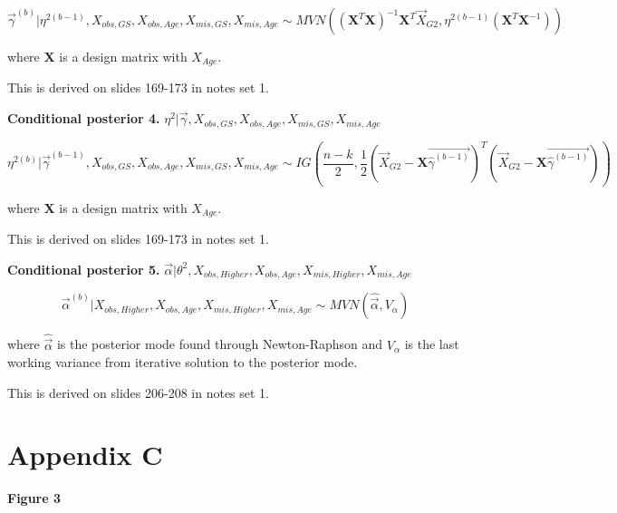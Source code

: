 \documentclass[11pt]{article}
\begin{document}
$$\vec{\gamma}^{(b)}|\eta^{2(b - 1)}, X_{obs, GS}, X_{obs, Age}, X_{mis, GS}, X_{mis, Age} \sim MVN((\mathbf{X}^T\mathbf{X})^{-1}\mathbf{X}^T\vec{X}_{G2}, \eta^{2(b - 1)}(\mathbf{X}^T\mathbf{X}^{-1}))$$

where $\mathbf{X}$ is a design matrix with $X_{Age}$.

This is derived on slides 169-173 in notes set 1.

\vspace{0.25in}

\textbf{Conditional posterior 4.} $\eta^2|\vec{\gamma}, X_{obs, GS}, X_{obs, Age}, X_{mis, GS}, X_{mis, Age}$

$$\eta^{2(b)}|\vec{\gamma}^{(b - 1)}, X_{obs, GS}, X_{obs, Age}, X_{mis, GS}, X_{mis, Age} \sim IG\left(\frac{n - k}{2}, \frac{1}{2}(\vec{X}_{G2} - \mathbf{X}\vec{\hat\gamma^{(b - 1)}})^T(\vec{X}_{G2} - \mathbf{X}\vec{\hat\gamma^{(b - 1)}})\right)$$

where $\mathbf{X}$ is a design matrix with $X_{Age}$.

This is derived on slides 169-173 in notes set 1.

\vspace{0.25in}

\textbf{Conditional posterior 5.} $\vec\alpha| \theta^2, X_{obs, Higher}, X_{obs, Age}, X_{mis, Higher}, X_{mis, Age}$

$$\vec\alpha^{(b)}|  X_{obs, Higher}, X_{obs, Age}, X_{mis, Higher}, X_{mis, Age} \sim MVN(\hat{\vec\alpha}, V_{\alpha})$$

where $\hat{\vec\alpha}$ is the posterior mode found through Newton-Raphson and $V_{\alpha}$ is the last working variance from iterative solution to the posterior mode.

This is derived on slides 206-208 in notes set 1.

\newpage

\section{Appendix C}

\textbf{Figure 3}
\end{document}
